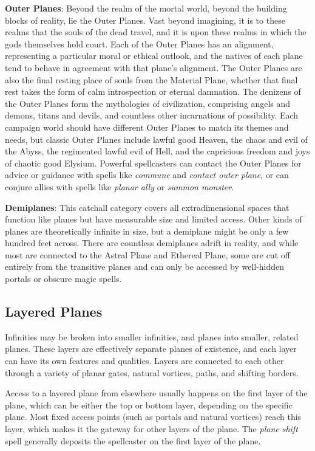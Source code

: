 \textbf{Outer Planes}: Beyond the realm of the mortal world, beyond the building blocks of reality, lie the Outer Planes. Vast beyond imagining, it is to these realms that the souls of the dead travel, and it is upon these realms in which the gods themselves hold court. Each of the Outer Planes has an alignment, representing a particular moral or ethical outlook, and the natives of each plane tend to behave in agreement with that plane's alignment. The Outer Planes are also the final resting place of souls from the Material Plane, whether that final rest takes the form of calm introspection or eternal damnation. The denizens of the Outer Planes form the mythologies of civilization, comprising angels and demons, titans and devils, and countless other incarnations of possibility. Each campaign world should have different Outer Planes to match its themes and needs, but classic Outer Planes include lawful good Heaven, the chaos and evil of the Abyss, the regimented lawful evil of Hell, and the capricious freedom and joys of chaotic good Elysium. Powerful spellcasters can contact the Outer Planes for advice or guidance with spells like \textit{commune} and \textit{contact outer plane}, or can conjure allies with spells like \textit{planar ally} or \textit{summon monster}.
				
\textbf{Demiplanes}: This catchall category covers all extradimensional spaces that function like planes but have measurable size and limited access. Other kinds of planes are theoretically infinite in size, but a demiplane might be only a few hundred feet across. There are countless demiplanes adrift in reality, and while most are connected to the Astral Plane and Ethereal Plane, some are cut off entirely from the transitive planes and can only be accessed by well-hidden portals or obscure magic spells.
				
\subsection{Layered Planes}

				
Infinities may be broken into smaller infinities, and planes into smaller, related planes. These layers are effectively separate planes of existence, and each layer can have its own features and qualities. Layers are connected to each other through a variety of planar gates, natural vortices, paths, and shifting borders.
				
Access to a layered plane from elsewhere usually happens on the first layer of the plane, which can be either the top or bottom layer, depending on the specific plane. Most fixed access points (such as portals and natural vortices) reach this layer, which makes it the gateway for other layers of the plane. The \textit{plane shift} spell generally deposits the spellcaster on the first layer of the plane.
				
